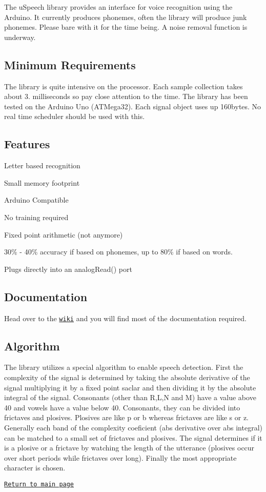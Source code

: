 The u\-Speech library provides an interface for voice recognition using the Arduino. It currently produces phonemes, often the library will produce junk phonemes. Please bare with it for the time being. A noise removal function is underway. \subsection*{Minimum Requirements}

The library is quite intensive on the processor. Each sample collection takes about 3. milliseconds so pay close attention to the time. The library has been tested on the Arduino Uno (A\-T\-Mega32). Each signal object uses up 160bytes. No real time scheduler should be used with this.

\subsection*{Features}


\begin{DoxyItemize}
\item Letter based recognition
\item Small memory footprint
\item Arduino Compatible
\item No training required
\item Fixed point arithmetic (not anymore)
\item 30\% -\/ 40\% accuracy if based on phonemes, up to 80\% if based on words.
\item Plugs directly into an {\ttfamily analog\-Read()} port
\end{DoxyItemize}

\subsection*{Documentation}

Head over to the \href{https://github.com/arjo129/uSpeech/wiki}{\tt wiki} and you will find most of the documentation required.

\subsection*{Algorithm}

The library utilizes a special algorithm to enable speech detection. First the complexity of the signal is determined by taking the absolute derivative of the signal multiplying it by a fixed point saclar and then dividing it by the absolute integral of the signal. Consonants (other than R,L,N and M) have a value above 40 and vowels have a value below 40. Consonants, they can be divided into frictaves and plosives. Plosives are like p or b whereas frictaves are like s or z. Generally each band of the complexity coeficient (abs derivative over abs integral) can be matched to a small set of frictaves and plosives. The signal determines if it is a plosive or a frictave by watching the length of the utterance (plosives occur over short periods while frictaves over long). Finally the most appropriate character is chosen.


\begin{DoxyItemize}
\item \href{http://arjo129.github.com}{\tt Return to main page} 
\end{DoxyItemize}